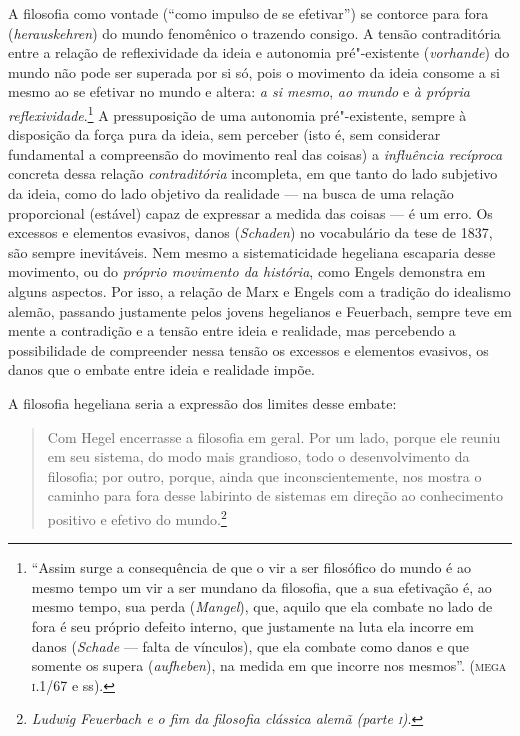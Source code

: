 A filosofia como vontade (``como impulso de se efetivar'') se contorce
para fora (\emph{herauskehren}) do mundo fenomênico o trazendo consigo.
A tensão contraditória entre a relação de reflexividade da ideia e
autonomia pré"-existente (\emph{vorhande}) do mundo não pode ser
superada por si só, pois o movimento da ideia consome a si mesmo ao se
efetivar no mundo e altera: \emph{a si mesmo}, \emph{ao mundo} e
\emph{à própria reflexividade}.\footnote{``Assim surge a consequência de
  que o vir a ser filosófico do mundo é ao mesmo tempo um vir a ser
  mundano da filosofia, que a sua efetivação é, ao mesmo tempo, sua
  perda (\emph{Mangel}), que, aquilo que ela combate no lado de fora é
  seu próprio defeito interno, que justamente na luta ela incorre em
  danos (\emph{Schade} --- falta de vínculos), que ela combate como
  danos e que somente os supera (\emph{aufheben}), na medida em que
  incorre nos mesmos''. (\textsc{mega} \textsc{i}.1/67 e ss).} A
pressuposição de uma autonomia pré"-existente, sempre à disposição da
força pura da ideia, sem perceber (isto é, sem considerar fundamental a
compreensão do movimento real das coisas) a \emph{influência recíproca}
concreta dessa relação \emph{contraditória} incompleta, em que tanto do
lado subjetivo da ideia, como do lado objetivo da realidade --- na busca
de uma relação proporcional (estável) capaz de expressar a medida das
coisas --- é um erro. Os excessos e elementos evasivos, danos
(\emph{Schaden}) no vocabulário da tese de 1837, são sempre inevitáveis.
Nem mesmo a sistematicidade hegeliana escaparia desse movimento, ou do
\emph{próprio movimento da história}, como Engels demonstra em alguns
aspectos. Por isso, a relação de Marx e Engels com a tradição do
idealismo alemão, passando justamente pelos jovens hegelianos e
Feuerbach, sempre teve em mente a contradição e a tensão entre ideia e
realidade, mas percebendo a possibilidade de compreender nessa tensão os
excessos e elementos evasivos, os danos que o embate entre ideia e
realidade impõe.

A filosofia hegeliana seria a expressão dos limites desse embate:

\begin{quote}
Com Hegel encerrasse a filosofia em geral. Por um lado, porque ele %
reuniu em seu sistema, do modo mais grandioso, todo o desenvolvimento da
filosofia; por outro, porque, ainda que inconscientemente, nos mostra o
caminho para fora desse labirinto de sistemas em direção ao conhecimento
positivo e efetivo do mundo.\footnote{\emph{Ludwig Feuerbach e o fim
  da filosofia clássica alemã (parte \textsc{i})}.}
\end{quote}


